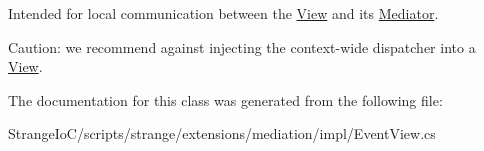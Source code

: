 Intended for local communication between the \hyperlink{classstrange_1_1extensions_1_1mediation_1_1impl_1_1_view}{View} and its \hyperlink{classstrange_1_1extensions_1_1mediation_1_1impl_1_1_mediator}{Mediator}.

Caution\-: we recommend against injecting the context-\/wide dispatcher into a \hyperlink{classstrange_1_1extensions_1_1mediation_1_1impl_1_1_view}{View}. 

The documentation for this class was generated from the following file\-:\begin{DoxyCompactItemize}
\item 
Strange\-Io\-C/scripts/strange/extensions/mediation/impl/Event\-View.\-cs\end{DoxyCompactItemize}
